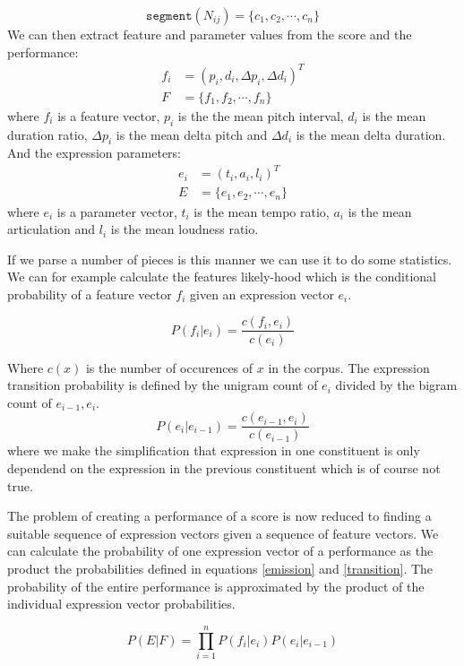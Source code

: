 \documentclass[a4paper,10pt]{article}
\begin{document}
\[\texttt{segment}(N_{ij}) = \{c_1, c_2, \cdots, c_n\}\]
We can then extract feature and parameter values from the score and the performance:
\begin{align*}
f_i &= (p_i, d_i, \Delta p_i, \Delta d_i)^T\\
F &= \{f_1, f_2, \cdots, f_n\}
\end{align*}
where $f_i$ is a feature vector, $p_i$ is the the mean pitch interval, $d_i$ is the mean duration ratio, $\Delta p_i$ is the mean delta pitch and $\Delta d_i$ is the mean delta duration.
And the expression parameters: 
\begin{align*}
e_i &= (t_i, a_i, l_i)^T\\
E &= \{e_1, e_2, \cdots, e_n\}
\end{align*}
where $e_i$ is a parameter vector, $t_i$ is the mean tempo ratio, $a_i$ is the mean articulation and $l_i$ is the mean loudness ratio.

If we parse a number of pieces is this manner we can use it to do some statistics. We can for example calculate the features likely-hood which is the conditional probability of a feature vector $f_i$ given an expression vector $e_i$.

\begin{equation}
\label{emission}
P(f_i|e_i) = \frac{c(f_i, e_i)}{c(e_i)}
\end{equation}

Where $c(x)$ is the number of occurences of $x$ in the corpus.
The expression transition probability is defined by the unigram count of $e_i$ divided by the bigram count of $e_{i-1}, e_i$.
\begin{equation}
\label{transition}
P(e_i|e_{i-1}) = \frac{c(e_{i-1}, e_i)}{c(e_{i-1})}
\end{equation}
where we make the simplification that expression in one constituent is only dependend on the expression in the previous constituent which is of course not true.

The problem of creating a performance of a score is now reduced to finding a suitable sequence of expression vectors given a sequence of feature vectors. We can calculate the probability of one expression vector of a performance as the product the probabilities defined in equations \ref{emission} and \ref{transition}. The probability of the entire performance is approximated by the product of the individual expression vector probabilities.

\begin{equation}
P(E|F) = \displaystyle\prod_{i=1}^{n}P(f_i|e_i)P(e_i|e_{i-1})
\end{equation}
\end{document}

